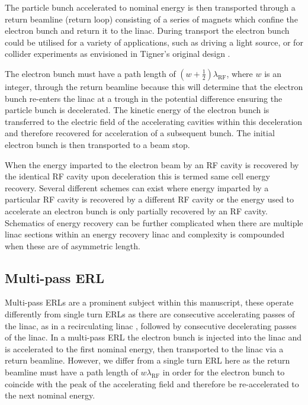 \documentclass[../main.tex]{subfiles}
\begin{document}
The particle bunch accelerated to nominal energy is then transported through a return beamline (return loop) consisting of a series of magnets which confine the electron bunch and return it to the linac. During transport the electron bunch could be utilised for a variety of applications, such as driving a light source, or for collider experiments as envisioned in Tigner's original design \cite{tigner1965possible}.

The electron bunch must have a path length of $\left(w+\frac{1}{2}\right)\lambda_{\mathrm{RF}}$, where $w$ is an integer, through the return beamline because this will determine that the electron bunch re-enters the linac at a trough in the potential difference ensuring the particle bunch is decelerated. The kinetic energy of the electron bunch is transferred to the electric field of the accelerating cavities within this deceleration and therefore recovered for acceleration of a subsequent bunch. The initial electron bunch is then transported to a beam stop.

When the energy imparted to the electron beam by an RF cavity is recovered by the identical RF cavity upon deceleration this is termed same cell energy recovery. Several different schemes can exist where energy imparted by a particular RF cavity is recovered by a different RF cavity or the energy used to accelerate an electron bunch is only partially recovered by an RF cavity. Schematics of energy recovery can be further complicated when there are multiple linac sections within an energy recovery linac and complexity is compounded when these are of asymmetric length.     

\subsection{Multi-pass ERL}

Multi-pass ERLs are a prominent subject within this manuscript, these operate differently from single turn ERLs as there are consecutive accelerating passes of the linac, as in a recirculating linac \cite{axel1977status}, followed by consecutive decelerating passes of the linac. In a multi-pass ERL the electron bunch is injected into the linac and is accelerated to the first nominal energy, then transported to the linac via a return beamline. However, we differ from a single turn ERL here as the return beamline must have a path length of $w\lambda_{\mathrm{RF}}$ in order for the electron bunch to coincide with the peak of the accelerating field and therefore be re-accelerated to the next nominal energy.
\end{document}
